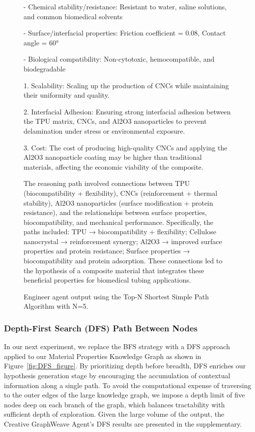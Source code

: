 \begin{figure}[htbp]
\begin{mdframed}
    - Chemical stability/resistance: Resistant to water, saline solutions, and common biomedical solvents
    
    - Surface/interfacial properties: Friction coefficient = 0.08, Contact angle = 60°
    
    - Biological compatibility: Non-cytotoxic, hemocompatible, and biodegradable
    
    \textbf{}
    
    1. Scalability: Scaling up the production of CNCs while maintaining their uniformity and quality.
    
    2. Interfacial Adhesion: Ensuring strong interfacial adhesion between the TPU matrix, CNCs, and Al2O3 nanoparticles to prevent delamination under stress or environmental exposure.

    3. Cost: The cost of producing high-quality CNCs and applying the Al2O3 nanoparticle coating may be higher than traditional materials, affecting the economic viability of the composite.
    
    \textbf{}
    
    The reasoning path involved connections between TPU (biocompatibility + flexibility), CNCs (reinforcement + thermal stability), Al2O3 nanoparticles (surface modification + protein resistance), and the relationships between surface properties, biocompatibility, and mechanical performance. Specifically, the paths included: TPU → biocompatibility + flexibility; Cellulose nanocrystal → reinforcement synergy; Al2O3 → improved surface properties and protein resistance; Surface properties → biocompatibility and protein adsorption. These connections led to the hypothesis of a composite material that integrates these beneficial properties for biomedical tubing applications.
    
  \end{mdframed}
  \caption{Engineer agent output using the Top-N Shortest Simple Path Algorithm with N=5.}
  \label{fig:engineer_topN}
\end{figure}

\subsubsection{Depth-First Search (DFS) Path Between Nodes}
In our next experiment, we replace the BFS strategy with a DFS approach applied to our Material Properties Knowledge Graph as shown in Figure~\ref{fig:DFS_figure}. By prioritizing depth before breadth, DFS enriches our hypothesis generation stage by encouraging the accumulation of contextual information along a single path. To avoid the computational expense of traversing to the outer edges of the large knowledge graph, we impose a depth limit of five nodes deep on each branch of the graph, which balances tractability with sufficient depth of exploration. Given the large volume of the output, the Creative GraphWeave Agent’s DFS results are presented in the supplementary. 


